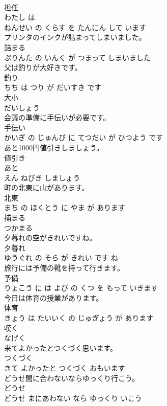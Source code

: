 \documentclass[8pt]{extreport}
\begin{document}
\begin{CJK}{UTF8}{min}
\\	担任 
\\	わたし は 
\\	ねんせい の くらす を たんにん して います			
\\	プリンタのインクが詰まってしまいました。	
\\	詰まる 
\\	ぷりんた の いんく が つまって しまいました			
\\	父は釣りが大好きです。	
\\	釣り 
\\	ちち は つり が だいすき です			
\\	大小	
\\	だいしょう			
\\	会議の準備に手伝いが必要です。	
\\	手伝い 
\\	かいぎ の じゅんび に てつだい が ひつよう です			
\\	あと1000円値引きしましょう。	
\\	値引き 
\\	あと 
\\	えん ねびき しましょう			
\\	町の北東に山があります。	
\\	北東 
\\	まち の ほくとう に やま が あります			
\\	捕まる	
\\	つかまる			
\\	夕暮れの空がきれいですね。	
\\	夕暮れ 
\\	ゆうぐれ の そら が きれい です ね			
\\	旅行には予備の靴を持って行きます。	
\\	予備 
\\	りょこう に は よび の くつ を もって いきます			
\\	今日は体育の授業があります。	
\\	体育 
\\	きょう は たいいく の じゅぎょう が あります			
\\	嘆く	
\\	なげく			
\\	来てよかったとつくづく思います。	
\\	つくづく 
\\	きて よかったと つくづく おもいます			
\\	どうせ間に合わないならゆっくり行こう。	
\\	どうせ 
\\	どうせ まにあわない なら ゆっくり いこう			

\end{CJK}
\end{document}
